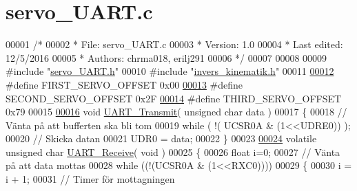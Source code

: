 \hypertarget{servo___u_a_r_t_8c_source}{}\section{servo\+\_\+\+U\+A\+R\+T.\+c}
\label{servo___u_a_r_t_8c_source}

\begin{DoxyCode}
00001 \textcolor{comment}{/*}
00002 \textcolor{comment}{ *        File: servo\_UART.c}
00003 \textcolor{comment}{ *     Version: 1.0}
00004 \textcolor{comment}{ * Last edited: 12/5/2016 }
00005 \textcolor{comment}{ *     Authors: chrma018, erilj291}
00006 \textcolor{comment}{ */} 
00007 
00008 
00009 \textcolor{preprocessor}{#include "\hyperlink{servo___u_a_r_t_8h}{servo\_UART.h}"}
00010 \textcolor{preprocessor}{#include "\hyperlink{invers__kinematik_8h}{invers\_kinematik.h}"}
00011 
\hypertarget{servo___u_a_r_t_8c_source.tex_l00012}{}\hyperlink{servo___u_a_r_t_8c_a4c437d01d2f060ec86c16ed5e76efe45}{00012} \textcolor{preprocessor}{#define FIRST\_SERVO\_OFFSET 0x00}
\hypertarget{servo___u_a_r_t_8c_source.tex_l00013}{}\hyperlink{servo___u_a_r_t_8c_acb02dedbe5ff19694bdb5b2ddf61664a}{00013} \textcolor{preprocessor}{#define SECOND\_SERVO\_OFFSET 0x2F}
\hypertarget{servo___u_a_r_t_8c_source.tex_l00014}{}\hyperlink{servo___u_a_r_t_8c_ac2f065c44b617c91ea7f4237e8ead729}{00014} \textcolor{preprocessor}{#define THIRD\_SERVO\_OFFSET 0x79}
00015 
\hypertarget{servo___u_a_r_t_8c_source.tex_l00016}{}\hyperlink{servo___u_a_r_t_8h_af34dbb08e8f6cfc1a58d9b7f2b81f455}{00016} \textcolor{keywordtype}{void} \hyperlink{servo___u_a_r_t_8c_af34dbb08e8f6cfc1a58d9b7f2b81f455}{UART\_Transmit}( \textcolor{keywordtype}{unsigned} \textcolor{keywordtype}{char} data )
00017 \{
00018     \textcolor{comment}{// Vänta på att bufferten ska bli tom}
00019     \textcolor{keywordflow}{while} ( !( UCSR0A & (1<<UDRE0)) );
00020     \textcolor{comment}{// Skicka datan}
00021     UDR0 = data;
00022 \}
00023 
\hypertarget{servo___u_a_r_t_8c_source.tex_l00024}{}\hyperlink{servo___u_a_r_t_8h_ae61a7bb5a727a8605e5865fc36e4e26b}{00024} \textcolor{keyword}{volatile} \textcolor{keywordtype}{unsigned} \textcolor{keywordtype}{char} \hyperlink{servo___u_a_r_t_8c_ae61a7bb5a727a8605e5865fc36e4e26b}{UART\_Receive}( \textcolor{keywordtype}{void} )
00025 \{
00026     \textcolor{keywordtype}{float} i=0;
00027     \textcolor{comment}{// Vänta på att data mottas}
00028     \textcolor{keywordflow}{while} ((!(UCSR0A & (1<<RXC0))))
00029     \{
00030         i = i + 1; 
00031         \textcolor{comment}{// Timer för mottagningen}

\end{DoxyCode}
